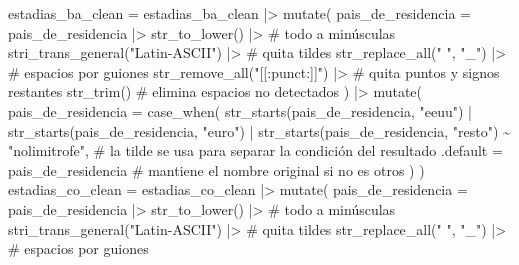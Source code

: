 \documentclass[
  spanish,
  letterpaper,
  DIV=11,
  numbers=noendperiod]{scrartcl}
\newenvironment{Shaded}{\begin{snugshade}}{\end{snugshade}}
\newcommand{\AttributeTok}[1]{\textcolor[rgb]{0.40,0.45,0.13}{#1}}
\newcommand{\CommentTok}[1]{\textcolor[rgb]{0.37,0.37,0.37}{#1}}
\newcommand{\FunctionTok}[1]{\textcolor[rgb]{0.28,0.35,0.67}{#1}}
\newcommand{\NormalTok}[1]{\textcolor[rgb]{0.00,0.23,0.31}{#1}}
\newcommand{\OtherTok}[1]{\textcolor[rgb]{0.00,0.23,0.31}{#1}}
\newcommand{\SpecialCharTok}[1]{\textcolor[rgb]{0.37,0.37,0.37}{#1}}
\newcommand{\StringTok}[1]{\textcolor[rgb]{0.13,0.47,0.30}{#1}}
\begin{document}
\begin{Shaded}
\begin{Highlighting}[]
\NormalTok{estadias\_ba\_clean }\OtherTok{=}\NormalTok{ estadias\_ba\_clean }\SpecialCharTok{|\textgreater{}} 
  \FunctionTok{mutate}\NormalTok{(}
    \AttributeTok{pais\_de\_residencia =}\NormalTok{ pais\_de\_residencia }\SpecialCharTok{|\textgreater{}} 
           \FunctionTok{str\_to\_lower}\NormalTok{() }\SpecialCharTok{|\textgreater{}}          \CommentTok{\# todo a minúsculas}
           \FunctionTok{stri\_trans\_general}\NormalTok{(}\StringTok{"Latin{-}ASCII"}\NormalTok{) }\SpecialCharTok{|\textgreater{}} \CommentTok{\# quita tildes }
           \FunctionTok{str\_replace\_all}\NormalTok{(}\StringTok{" "}\NormalTok{, }\StringTok{"\_"}\NormalTok{) }\SpecialCharTok{|\textgreater{}}     \CommentTok{\# espacios por guiones}
           \FunctionTok{str\_remove\_all}\NormalTok{(}\StringTok{"[[:punct:]]"}\NormalTok{) }\SpecialCharTok{|\textgreater{}} \CommentTok{\# quita puntos y signos restantes}
           \FunctionTok{str\_trim}\NormalTok{() }\CommentTok{\# elimina espacios no detectados}
\NormalTok{  ) }\SpecialCharTok{|\textgreater{}} 
  \FunctionTok{mutate}\NormalTok{(}
    \AttributeTok{pais\_de\_residencia =} \FunctionTok{case\_when}\NormalTok{(}
      \FunctionTok{str\_starts}\NormalTok{(pais\_de\_residencia, }\StringTok{"eeuu"}\NormalTok{) }\SpecialCharTok{|} 
      \FunctionTok{str\_starts}\NormalTok{(pais\_de\_residencia, }\StringTok{"euro"}\NormalTok{) }\SpecialCharTok{|} 
      \FunctionTok{str\_starts}\NormalTok{(pais\_de\_residencia, }\StringTok{"resto"}\NormalTok{) }\SpecialCharTok{\textasciitilde{}} \StringTok{"nolimitrofe"}\NormalTok{, }\CommentTok{\# la tilde se usa para separar la condición del resultado}
      \AttributeTok{.default =}\NormalTok{ pais\_de\_residencia }\CommentTok{\# mantiene el nombre original si no es \textquotesingle{}otros\textquotesingle{}}
\NormalTok{    )}
\NormalTok{  )}
\NormalTok{estadias\_co\_clean }\OtherTok{=}\NormalTok{ estadias\_co\_clean }\SpecialCharTok{|\textgreater{}} 
  \FunctionTok{mutate}\NormalTok{(}
    \AttributeTok{pais\_de\_residencia =}\NormalTok{ pais\_de\_residencia }\SpecialCharTok{|\textgreater{}} 
           \FunctionTok{str\_to\_lower}\NormalTok{() }\SpecialCharTok{|\textgreater{}}          \CommentTok{\# todo a minúsculas}
           \FunctionTok{stri\_trans\_general}\NormalTok{(}\StringTok{"Latin{-}ASCII"}\NormalTok{) }\SpecialCharTok{|\textgreater{}} \CommentTok{\# quita tildes }
           \FunctionTok{str\_replace\_all}\NormalTok{(}\StringTok{" "}\NormalTok{, }\StringTok{"\_"}\NormalTok{) }\SpecialCharTok{|\textgreater{}}     \CommentTok{\# espacios por guiones}

\end{Highlighting}
\end{Shaded}
\end{document}
